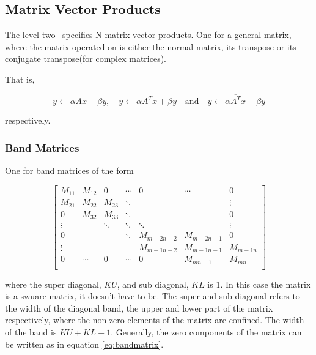 
\subsection{Matrix Vector Products}

The level two \BLAS\ specifies N matrix vector products. One for a
general matrix, where the matrix operated on is either the normal
matrix, its transpose or its conjugate transpose(for complex
matrices).

That is,

\[
y \gets \alpha A x + \beta y, \quad
y \gets \alpha A^T x + \beta y \quad \textrm{and}  \quad
y \gets \alpha \overline{A^T} x + \beta y 
\]

respectively.

\subsubsection{Band Matrices}

One for band matrices of the form

\[\left[
\begin{array}{ccccccc}
M_{11}  & M_{12} & 0      & \cdots & 0         & \cdots    & 0 \\
M_{21}  & M_{22} & M_{23}  & \ddots  &         &           & \vdots \\
0      & M_{32}  & M_{33} & \ddots &           &           & 0 \\
\vdots &        & \ddots & \ddots & \ddots    &           & \vdots \\
0      &        &        & \ddots & M_{m-2n-2} & M_{m-2n-1} & 0 \\
\vdots &        &        &        & M_{m-1n-2} & M_{m-1n-1} & M_{m-1n} \\
0      & \cdots & 0      & \cdots & 0         & M_{mn-1}   & M_{mn} \\
\end{array}
\right]\]

where the super diagonal, $KU$, and sub diagonal, $KL$ is 1. In this
case the matrix is a swuare matrix, it doesn't have to be. The super
and sub diagonal refers to the width of the diagonal band, the upper
and lower part of the matrix respectively, where the non zero elements
of the matrix are confined. The width of the band is $KU + KL +
1$. Generally, the zero components of the matrix can be written as in
equation \ref{eq:bandmatrix}.

